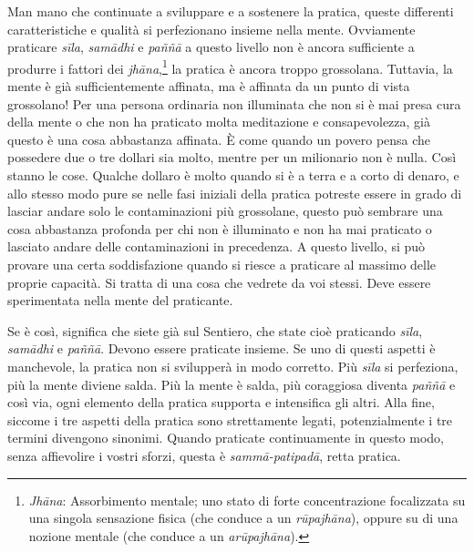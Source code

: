 Man mano che continuate a sviluppare e a sostenere la pratica, queste
differenti caratteristiche e qualità si perfezionano insieme nella
mente. Ovviamente praticare \emph{sīla}, \emph{samādhi} e \emph{paññā} a
questo livello non è ancora sufficiente a produrre i fattori dei
\emph{jhāna},\footnote{\emph{Jhāna}: Assorbimento mentale; uno stato di
  forte concentrazione focalizzata su una singola sensazione fisica (che
  conduce a un \emph{rūpajhāna}), oppure su di una nozione mentale (che
  conduce a un \emph{arūpajhāna}).} la pratica è ancora troppo
grossolana. Tuttavia, la mente è già sufficientemente affinata, ma è
affinata da un punto di vista grossolano! Per una persona ordinaria non
illuminata che non si è mai presa cura della mente o che non ha
praticato molta meditazione e consapevolezza, già questo è una cosa
abbastanza affinata. È come quando un povero pensa che possedere due o
tre dollari sia molto, mentre per un milionario non è nulla. Così stanno
le cose. Qualche dollaro è molto quando si è a terra e a corto di
denaro, e allo stesso modo pure se nelle fasi iniziali della pratica
potreste essere in grado di lasciar andare solo le contaminazioni più
grossolane, questo può sembrare una cosa abbastanza profonda per chi non
è illuminato e non ha mai praticato o lasciato andare delle
contaminazioni in precedenza. A questo livello, si può provare una certa
soddisfazione quando si riesce a praticare al massimo delle proprie
capacità. Si tratta di una cosa che vedrete da voi stessi. Deve essere
sperimentata nella mente del praticante.

Se è così, significa che siete già sul Sentiero, che state cioè
praticando \emph{sīla}, \emph{samādhi} e \emph{paññā}. Devono essere
praticate insieme. Se uno di questi aspetti è manchevole, la pratica non
si svilupperà in modo corretto. Più \emph{sīla} si perfeziona, più la
mente diviene salda. Più la mente è salda, più coraggiosa diventa
\emph{paññā} e così via, ogni elemento della pratica supporta e
intensifica gli altri. Alla fine, siccome i tre aspetti della pratica
sono strettamente legati, potenzialmente i tre termini divengono
sinonimi. Quando praticate continuamente in questo modo, senza
affievolire i vostri sforzi, questa è \emph{sammā-patipadā}, retta
pratica.

